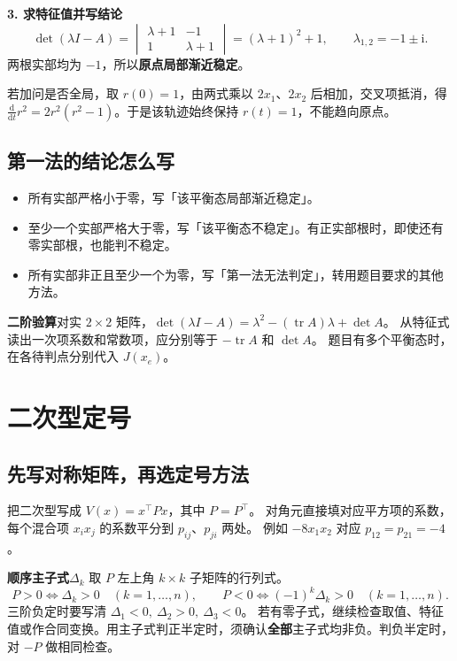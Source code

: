 \documentclass[UTF8,a4paper,11pt,fontset=fandol]{ctexart}
\begin{document}
\textbf{3. 求特征值并写结论}\quad
\[
  \det(\lambda I-A)
  =\begin{vmatrix}\lambda+1&-1\\ 1&\lambda+1\end{vmatrix}
  =(\lambda+1)^2+1,
  \qquad \lambda_{1,2}=-1\pm\mathrm{i}.
\]
两根实部均为 $-1$，所以\textbf{原点局部渐近稳定}。

若加问是否全局，取 $r(0)=1$，由两式乘以 $2x_1$、$2x_2$ 后相加，交叉项抵消，得 $\frac{\mathrm d}{\mathrm dt}r^2=2r^2(r^2-1)$。于是该轨迹始终保持 $r(t)=1$，不能趋向原点。

\subsection*{第一法的结论怎么写}

\begin{itemize}
  \item 所有实部严格小于零，写「该平衡态局部渐近稳定」。
  \item 至少一个实部严格大于零，写「该平衡态不稳定」。有正实部根时，即使还有零实部根，也能判不稳定。
  \item 所有实部非正且至少一个为零，写「第一法无法判定」，转用题目要求的其他方法。
\end{itemize}

\begin{keybox}
\textbf{二阶验算}\quad 对实 $2\times2$ 矩阵，$\det(\lambda I-A)=\lambda^2-(\operatorname{tr}A)\lambda+\det A$。
从特征式读出一次项系数和常数项，应分别等于 $-\operatorname{tr}A$ 和 $\det A$。
题目有多个平衡态时，在各待判点分别代入 $J(x_e)$。
\end{keybox}

\newpage
\section{二次型定号}\label{sec:quadratic}

\subsection*{先写对称矩阵，再选定号方法}

把二次型写成 $V(x)=x^\top P x$，其中 $P=P^\top$。
对角元直接填对应平方项的系数，每个混合项 $x_ix_j$ 的系数平分到 $p_{ij}$、$p_{ji}$ 两处。
例如 $-8x_1x_2$ 对应 $p_{12}=p_{21}=-4$。

\textbf{顺序主子式}\quad $\Delta_k$ 取 $P$ 左上角 $k\times k$ 子矩阵的行列式。
\[
  P>0\iff \Delta_k>0\quad(k=1,\ldots,n),\qquad
  P<0\iff (-1)^k\Delta_k>0\quad(k=1,\ldots,n).
\]
三阶负定时要写清 $\Delta_1<0,\ \Delta_2>0,\ \Delta_3<0$。
若有零子式，继续检查取值、特征值或作合同变换。用主子式判正半定时，须确认\textbf{全部}主子式均非负。判负半定时，对 $-P$ 做相同检查。
\end{document}

